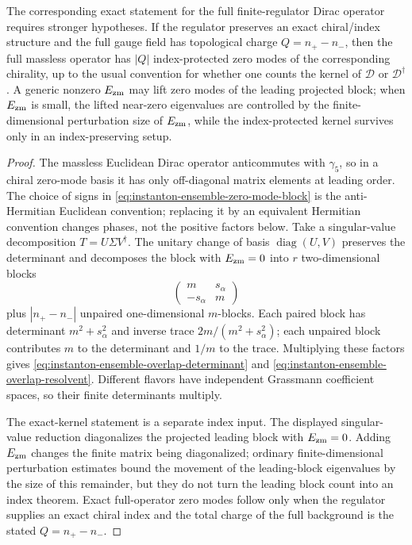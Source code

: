 \begin{proposition}
The corresponding exact statement for the full finite-regulator Dirac
operator requires stronger hypotheses.  If the regulator preserves an exact
chiral/index structure and the full gauge field has topological charge
\(Q=n_+-n_-\), then the full massless operator has
\(|Q|\) index-protected zero modes of the corresponding chirality, up to the
usual convention for whether one counts the kernel of \(\mathcal D\) or
\(\mathcal D^\dagger\).  A generic nonzero \(E_{\rm zm}\) may lift zero modes
of the leading projected block; when \(E_{\rm zm}\) is small, the lifted
near-zero eigenvalues are controlled by the finite-dimensional perturbation
size of \(E_{\rm zm}\), while the index-protected kernel survives only in an
index-preserving setup.
\end{proposition}

\begin{proof}
The massless Euclidean Dirac operator anticommutes with \(\gamma_5\), so in a
chiral zero-mode basis it has only off-diagonal matrix elements at leading
order.  The choice of signs in \eqref{eq:instanton-ensemble-zero-mode-block} is
the anti-Hermitian Euclidean convention; replacing it by an equivalent
Hermitian convention changes phases, not the positive factors below.  Take a
singular-value decomposition \(T=U\Sigma V^\dagger\).  The unitary change of
basis \(\operatorname{diag}(U,V)\) preserves the determinant and decomposes the
block with \(E_{\rm zm}=0\) into \(r\) two-dimensional blocks
\[
  \begin{pmatrix}m&s_\alpha\\ -s_\alpha&m\end{pmatrix}
\]
plus \(|n_+-n_-|\) unpaired one-dimensional \(m\)-blocks.  Each paired block
has determinant \(m^2+s_\alpha^2\) and inverse trace
\(2m/(m^2+s_\alpha^2)\); each unpaired block contributes \(m\) to the
determinant and \(1/m\) to the trace.  Multiplying these factors gives
\eqref{eq:instanton-ensemble-overlap-determinant} and
\eqref{eq:instanton-ensemble-overlap-resolvent}.  Different flavors have
independent Grassmann coefficient spaces, so their finite determinants
multiply.

The exact-kernel statement is a separate index input.  The displayed
singular-value reduction diagonalizes the projected leading block with
\(E_{\rm zm}=0\).  Adding \(E_{\rm zm}\) changes the finite matrix being
diagonalized; ordinary finite-dimensional perturbation estimates bound the
movement of the leading-block eigenvalues by the size of this remainder, but
they do not turn the leading block count into an index theorem.  Exact
full-operator zero modes follow only when the regulator supplies an exact
chiral index and the total charge of the full background is the stated
\(Q=n_+-n_-\).
\end{proof}

